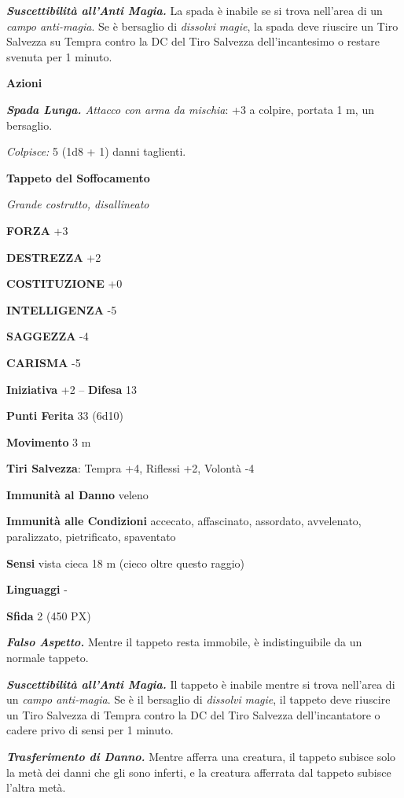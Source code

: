 \begin{multicols}{2}
\textit{\textbf{Suscettibilità all'Anti Magia.}} La spada è inabile se si trova nell'area di un \textit{campo anti-magia}. Se è bersaglio di \textit{dissolvi} \textit{magie}, la spada deve riuscire un Tiro Salvezza su Tempra contro la DC del Tiro Salvezza dell'incantesimo o restare svenuta per 1 minuto.

\textbf{Azioni}

\textit{\textbf{Spada Lunga.} Attacco con arma da mischia}: +3 a colpire, portata 1 m, un bersaglio.

\textit{Colpisce:} 5 (1d8 + 1) danni taglienti.


\medskip{}\textbf{Tappeto del Soffocamento}

\textit{Grande costrutto, disallineato}

\textbf{FORZA} +3

\textbf{DESTREZZA} +2

\textbf{COSTITUZIONE} +0

\textbf{INTELLIGENZA} -5

\textbf{SAGGEZZA} -4

\textbf{CARISMA} -5

\textbf{Iniziativa} +2 -- \textbf{Difesa} 13

\textbf{Punti Ferita} 33 (6d10)

\textbf{Movimento} 3 m

\textbf{Tiri Salvezza}: Tempra +4, Riflessi +2, Volontà -4

\textbf{Immunità al Danno} veleno

\textbf{Immunità alle Condizioni} accecato, affascinato, assordato, avvelenato, paralizzato, pietrificato, spaventato

\textbf{Sensi} vista cieca 18 m (cieco oltre questo raggio)

\textbf{Linguaggi} -

\textbf{Sfida} 2 (450 PX)

\textit{\textbf{Falso Aspetto.}} Mentre il tappeto resta immobile, è indistinguibile da un normale tappeto.

\textit{\textbf{Suscettibilità all'Anti Magia.}} Il tappeto è inabile mentre si trova nell'area di un \textit{campo anti-magia}. Se è il bersaglio di \textit{dissolvi} \textit{magie}, il tappeto deve riuscire un Tiro Salvezza di Tempra contro la DC del Tiro Salvezza dell'incantatore o cadere privo di sensi per 1 minuto.

\textit{\textbf{Trasferimento di Danno.}} Mentre afferra una creatura, il tappeto subisce solo la metà dei danni che gli sono inferti, e la creatura afferrata dal tappeto subisce l'altra metà.


\end{multicols}

